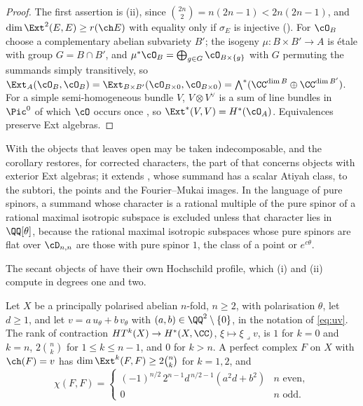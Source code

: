 \begin{proof}
The first assertion is (ii), since
$\binom{2n}{2}=n(2n-1)<2n(2n-1)$, and $\dim\Ext^{2}(E,E)\ge r(\ch E)$ with
equality only if $\sigma_{E}$ is injective (). For
$\cO_{B}$ choose a complementary abelian subvariety $B'$; the isogeny
$\mu\colon B\times B'\to A$ is \'etale with group $G=B\cap B'$, and
$\mu^{*}\cO_{B}=\bigoplus_{g\in G}\cO_{B\times\{g\}}$ with $G$ permuting the
summands simply transitively, so $\Ext_{A}(\cO_{B},\cO_{B})
=\Ext_{B\times B'}(\cO_{B\times0},\cO_{B\times0})=\bigwedge^{*}(\CC^{\dim B}
\oplus\CC^{\dim B'})$. For a simple semi-homogeneous bundle $V$,
$V\otimes V^{\vee}$ is a sum of line bundles in $\Pic^{0}$ of which $\cO$ occurs
once \cite{Muk78}, so $\Ext^{*}(V,V)=H^{*}(\cO_{A})$. Equivalences preserve
Ext algebras.
\end{proof}

With  the objects that 
leaves open may be taken indecomposable, and the corollary restores, for
corrected characters, the part of  that concerns objects with
exterior Ext algebras; it extends , whose summand has
a scalar Atiyah class, to the subtori, the points and the Fourier--Mukai
images. In the language of pure spinors, a summand whose
character is a rational multiple of the pure spinor of a rational maximal
isotropic subspace is excluded unless that character lies in $\QQ[\theta]$,
because the rational maximal isotropic subspaces whose pure spinors are flat
over $\cD_{n,n}$ are those with pure spinor $1$, the class of a point or
$e^{c\theta}$.

The secant objects of  have their own Hochschild
profile, which (i) and (ii) compute in degrees one and two.

\begin{proposition}
\label{prop:secantprofile}
Let $X$ be a principally polarised abelian $n$-fold, $n\ge2$, with
polarisation $\theta$, let $d\ge1$, and let $v=a\,u_{\theta}+b\,v_{\theta}$
with $(a,b)\in\QQ^{2}\setminus\{0\}$, in the notation of \eqref{eq:uv}. The
rank of contraction $HT^{k}(X)\to H^{*}(X,\CC)$, $\xi\mapsto\xi\lrcorner v$, is
$1$ for $k=0$ and $k=n$, $2\binom{n}{k}$ for $1\le k\le n-1$, and $0$ for
$k>n$. A perfect complex $F$ on $X$ with $\ch(F)=v$ has
$\dim\Ext^{k}(F,F)\ge2\binom{n}{k}$ for $k=1,2$, and
\[
  \chi(F,F)=\begin{cases}
    (-1)^{n/2}\,2^{n-1}d^{\,n/2-1}(a^{2}d+b^{2}) & n\text{ even},\\
    0 & n\text{ odd}.
  \end{cases}
\]
\end{proposition}

